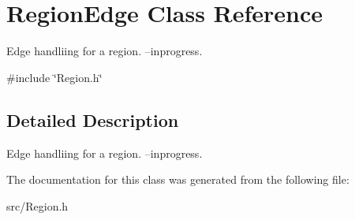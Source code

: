 \hypertarget{classRegionEdge}{}\section{Region\+Edge Class Reference}
\label{classRegionEdge}


Edge handliing for a region. --inprogress.  




{\ttfamily \#include \char`\"{}Region.\+h\char`\"{}}



\subsection{Detailed Description}
Edge handliing for a region. --inprogress. 

The documentation for this class was generated from the following file\+:\begin{DoxyCompactItemize}
\item 
src/Region.\+h\end{DoxyCompactItemize}
